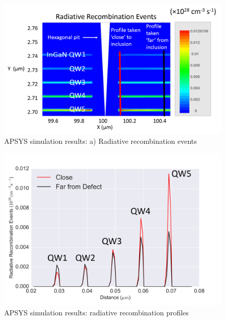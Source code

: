 \begin{figure}[h]
	\centering
	\includegraphics[width=1\textwidth]{Figs/Ch3/deep_big1.png}
	\caption[h] {APSYS simulation results: a) Radiative recombination events}
	\label{deep_big1}
\end{figure}
\FloatBarrier 

\begin{figure}[h]
	\centering
	\includegraphics[width=1\textwidth]{Figs/Ch3/5A_rad.png}
	\caption[h] {APSYS simulation results: radiative recombination profiles}
	\label{deep_big1-rad}
\end{figure}
\FloatBarrier

